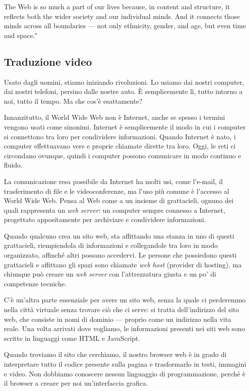 The Web is so much a part of our lives because, in content and structure, it reflects both the wider society and our individual minds. And it connects those minds across all boundaries — not only ethnicity, gender, and age, but even time and space."


\subsection{Traduzione video}

Usato dagli uomini, stiamo iniziando rivoluzioni. Lo usiamo dai nostri computer, dai nostri telefoni, persino dalle nostre auto. È semplicemente lì, tutto intorno a noi, tutto il tempo. Ma che cos'è esattamente?

Innanzitutto, il World Wide Web non è Internet, anche se spesso i termini vengono usati come sinonimi. Internet è semplicemente il modo in cui i computer si connettono tra loro per condividere informazioni. Quando Internet è nato, i computer effettuavano vere e proprie chiamate dirette tra loro. Oggi, le reti ci circondano ovunque, quindi i computer possono comunicare in modo continuo e fluido.

La comunicazione resa possibile da Internet ha molti usi, come l’e-mail, il trasferimento di file e le videoconferenze, ma l’uso più comune è l’accesso al World Wide Web. Pensa al Web come a un insieme di grattacieli, ognuno dei quali rappresenta un \textit{web server}: un computer sempre connesso a Internet, progettato appositamente per archiviare e condividere informazioni.

Quando qualcuno crea un sito web, sta affittando una stanza in uno di questi grattacieli, riempiendola di informazioni e collegandole tra loro in modo organizzato, affinché altri possano accedervi. Le persone che possiedono questi grattacieli e affittano gli spazi sono chiamate \textit{web host} (provider di hosting), ma chiunque può creare un \textit{web server} con l’attrezzatura giusta e un po’ di competenze tecniche.

C'è un'altra parte essenziale per avere un sito web, senza la quale ci perderemmo nella città virtuale senza trovare ciò che ci serve: si tratta dell’indirizzo del sito web, che consiste in nomi di dominio — proprio come un indirizzo nella vita reale. Una volta arrivati dove vogliamo, le informazioni presenti nei siti web sono scritte in linguaggi come HTML e JavaScript.

Quando troviamo il sito che cerchiamo, il nostro browser web è in grado di interpretare tutto il codice presente sulla pagina e trasformarlo in testi, immagini e video. Non dobbiamo conoscere nessun linguaggio di programmazione, perché è il browser a creare per noi un'interfaccia grafica.

